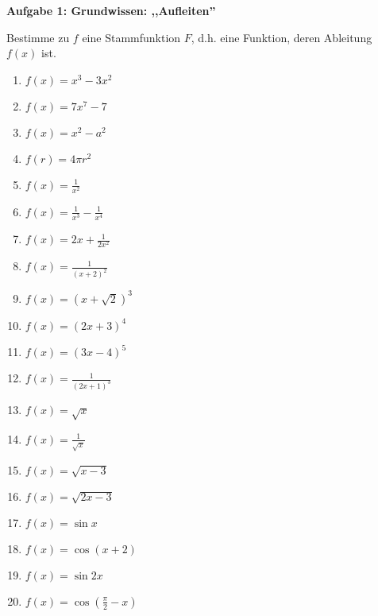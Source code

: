 \documentclass[a4paper,12pt]{article}
\newcommand{\Aufgabe}[1]{
  {
  \vspace*{0.5cm}
  \textsf{\textbf{Aufgabe #1}}
  \vspace*{0.2cm}
  
  }
}
\begin{document}
\vspace{1cm}




\newpage

\Aufgabe{1: Grundwissen: ,,Aufleiten''}
Bestimme zu $f$ eine Stammfunktion $F$, d.h. eine Funktion, deren Ableitung $f(x)$ ist.
\begin{enumerate}[label={\alph*)}, topsep=5pt,itemsep=4ex,partopsep=1ex,parsep=1ex]
  \item $f(x)=x^3-3x^2$
  \item $f(x)=7x^7-7$
  \item $f(x)=x^2-a^2$
  \item $f(r)=4\pi r^2$
  \item $f(x)=\frac{1}{x^2}$
  \item $f(x)=\frac{1}{x^3} - \frac{1}{x^4}$
  \item $f(x)=2x+\frac{1}{2x^2}$
  \item $f(x)=\frac{1}{(x+2)^2}$
  \item $f(x)=(x+\sqrt{2})^3$
  \item $f(x)=(2x+3)^4$
  \item $f(x)=(3x-4)^5$
  \item $f(x)=\frac{1}{(2x+1)^3}$
  \item $f(x)=\sqrt{x}$
  \item $f(x)=\frac{1}{\sqrt{x}}$
  \item $f(x)=\sqrt{x-3}$
  \item $f(x)=\sqrt{2x-3}$
  \item $f(x)=\sin x$
  \item $f(x)=\cos(x+2)$
  \item $f(x)=\sin{2x}$
  \item $f(x)=\cos(\frac{\pi}{2}-x)$
\end{enumerate}
\end{document}
